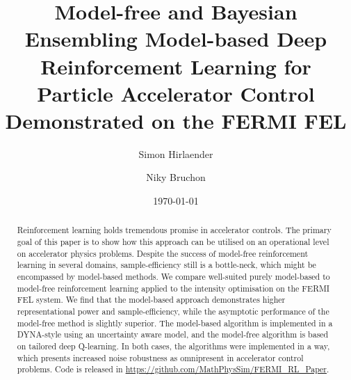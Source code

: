 \documentclass[
reprint,nofootinbib,
amsmath,amssymb,amsfonts,clevref,
aps,
prstab,
]{revtex4-2}
\begin{document}
	
	
	
	
	\title{Model-free and Bayesian Ensembling Model-based Deep Reinforcement Learning for Particle Accelerator Control Demonstrated on the FERMI FEL}
	
	
	
	\author{Simon Hirlaender}
	
	\author{Niky Bruchon}
	\date{\today}%
	
	
	
	\begin{abstract}
		Reinforcement learning holds tremendous promise in accelerator controls. The primary goal of this paper is to show how this approach can be utilised on an operational level on accelerator physics problems. Despite the success of model-free reinforcement learning in several domains, sample-efficiency still is a bottle-neck, which might be encompassed by model-based methods.
		We compare well-suited purely model-based to model-free reinforcement learning applied to the intensity optimisation on the FERMI FEL system. We find that the model-based approach demonstrates higher representational power and sample-efficiency, while the asymptotic performance of the model-free method is slightly superior. The model-based algorithm is implemented in a DYNA-style using an uncertainty aware model, and the model-free algorithm is based on tailored deep Q-learning. In both cases, the algorithms were implemented in a way, which presents increased noise robustness as omnipresent in accelerator control problems. Code is released in \url{https://github.com/MathPhysSim/FERMI_RL_Paper}.
		
	\end{abstract}
	\maketitle
	
\end{document}
